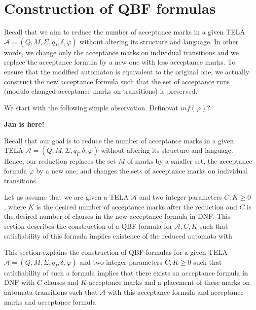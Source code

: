 \documentclass[a4paper,UKenglish,cleveref, autoref, thm-restate]{lipics-v2021}
\newcommand{\mA}{\mathcal{A}}
\begin{document}


\section{Construction of QBF formulas}\label{sec:qbf}

Recall that we aim to reduce the number of acceptance marks in a given
TELA $\mA =(Q,M,\Sigma,q_I,\delta,\varphi)$ without altering its
structure and language. In other words, we change only the acceptance
marks on individual transitions and we replace the acceptance formula
by a new one with less acceptance marks. To ensure that the modified
automaton is equivalent to the original one, we actually construct the
new acceptance formula such that the set of acceptance runs (modulo
changed acceptance marks on transitions) is preserved.

We start with the following simple observation. Definovat $inf(\varphi)$?


\textbf{Jan is here!}

Recall that our goal is to reduce the number of acceptance marks in a
given TELA $\mA =(Q,M,\Sigma,q_I,\delta,\varphi)$ without altering its
structure and language. Hence, our reduction replaces the set $M$ of
marks by a smaller set, the acceptance formula $\varphi$ by a new one,
and changes the sets of acceptance marks on individual transitions.





Let us assume that we are given a TELA $\mA$ and two integer
parameters $C,K\ge 0$, where $K$ is the desired number of acceptance
marks after the reduction and $C$ is the desired number of clauses in
the new acceptance formula in DNF. This section describes the
construction of a QBF formula for $\mA,C,K$ such that satisfiability
of this formula implies existence of the reduced automata with 




This section explains the construction of QBF formulas for a given
TELA $\mA =(Q,M,\Sigma,q_I,\delta,\varphi)$ and two integer parameters
$C,K\ge 0$ such that satisfiability of such a formula implies that
there exists an acceptance formula in DNF with $C$ clauses and $K$
acceptance marks and a placement of these marks on automata
transitions such that $\mA$ with this acceptance formula and
acceptance marks and acceptance formula
\end{document}
